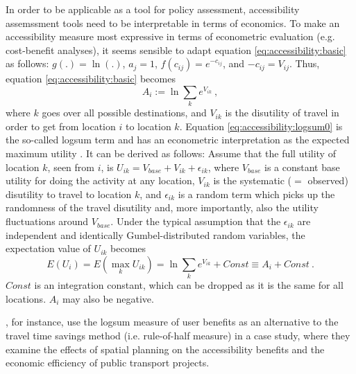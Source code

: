 In order to be applicable as a tool for policy assessment, accessibility assemssment tools need to be interpretable in
terms of economics. To make an accessibility measure most expressive in terms of econometric evaluation (e.g. cost-benefit 
analyses), it seems sensible to adapt equation \ref{eq:accessibility:basic} as 
follows: $g(.) = \ln(.)$, $a_j = 1$, $f(c_{ij}) = e^{-c_{ij}}$, and $-c_{ij} = V_{ij}$. Thus, 
equation \ref{eq:accessibility:basic} becomes
\begin{equation}
	A_i := \ln \sum_k e^{V_{ik}} \ ,
	\label{eq:accessibility:logsum0}
\end{equation}
where $k$ goes over all possible destinations, and $V_{ik}$ is the
disutility of travel in order to get from location $i$ to location
$k$. Equation \ref{eq:accessibility:logsum0} is the so-called logsum term and has an econometric interpretation 
as the expected maximum utility \citep[e.g.][]{Ben-AkivaBook, DejongEtc2005LogsumAsEvalDutchReport}. It can be 
derived as follows: Assume that the full utility of location $k$, seen 
from $i$, is $U_{ik} = V_{base} + V_{ik} + \epsilon_{ik}$, where $V_{base}$ is a constant 
base utility for doing the activity at any location, $V_{ik}$ is the systematic ($=$ observed) disutility to travel to 
location $k$, and $\epsilon_{ik}$ is a random term which picks up the randomness of the travel disutility and, more 
importantly, also the utility fluctuations around $V_{base}$.  Under the typical assumption that the $\epsilon_{ik}$ 
are independent and identically Gumbel-distributed random variables, the expectation value of $U_{ik}$ becomes
\begin{equation}
	E(U_i) = E(\max_k U_{ik}) = \ln \sum_k e^{V_{ik}} + Const \equiv A_i + Const \ .
\end{equation}
$Const$ is an integration constant, which can be dropped as it is the same for all locations. $A_i$ may also be negative.

\citet{GeursEtAl2012AccessibilityBenefitsNetherlands}, for instance, use the logsum measure of user benefits 
as an alternative to the travel time savings method (i.e. rule-of-half measure) in a case study, where they 
examine the effects of spatial planning on the accessibility benefits and the economic efficiency of public 
transport projects.


